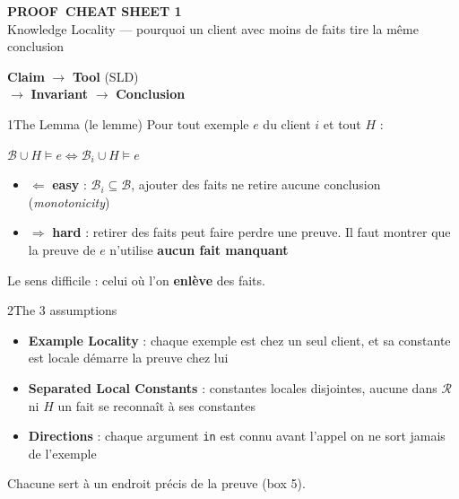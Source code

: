 \documentclass[10pt]{article}
\begin{document}
\begin{minipage}[c]{0.64\textwidth}
  {\fontsize{26}{28}\selectfont\bfseries\textcolor{marine}{PROOF}~CHEAT SHEET 1}\\[1pt]
  {\small Knowledge Locality --- pourquoi un client avec moins de faits tire la même conclusion}
\end{minipage}\hfill
\begin{minipage}[c]{0.34\textwidth}\raggedright
  \normalsize \textbf{Claim} $\to$ \textbf{Tool} (SLD)\\ $\to$ \textbf{Invariant} $\to$ \textbf{Conclusion}
\end{minipage}

\vspace{5pt}

\begin{minipage}[t]{0.32\textwidth}
\begin{bloc}{\num{1}The Lemma (le lemme)}
Pour tout exemple $e$ du client $i$ et tout $H$ :\\[2pt]
\centerline{$\mathcal{B}\cup H\models e \iff \mathcal{B}_i\cup H\models e$}
\begin{itemize}
  \item $\Leftarrow$ \textbf{easy} : $\mathcal{B}_i\subseteq\mathcal{B}$, ajouter des faits ne retire aucune conclusion (\emph{monotonicity})
  \item $\Rightarrow$ \textbf{hard} : retirer des faits peut faire perdre une preuve. Il faut montrer que la preuve de $e$ n'utilise \textbf{aucun fait manquant}
\end{itemize}
\begin{astuce}
Le sens difficile : celui où l'on \textbf{enlève} des faits.
\end{astuce}
\end{bloc}
\end{minipage}\hfill
\begin{minipage}[t]{0.32\textwidth}
\begin{bloc}{\num{2}The 3 assumptions}
\begin{itemize}
  \item \textbf{Example Locality} : chaque exemple est chez un seul client, et sa constante est locale \fl démarre la preuve chez lui
  \item \textbf{Separated Local Constants} : constantes locales disjointes, aucune dans $\mathcal{R}$ ni $H$ \fl un fait se reconnaît à ses constantes
  \item \textbf{Directions} : chaque argument \texttt{in} est connu avant l'appel \fl on ne sort jamais de l'exemple
\end{itemize}
\begin{astuce}
Chacune sert à un endroit précis de la preuve (box 5).
\end{astuce}
\end{bloc}
\end{minipage}\hfill
\end{document}
